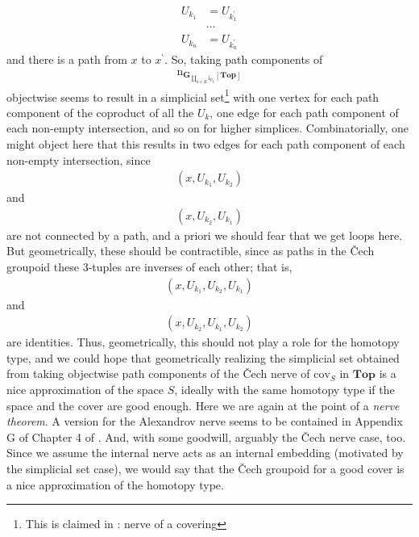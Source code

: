 \begin{align*}
  U_{k_{1}}
  &=
  U_{k_{1}^{\backprime}}
  \\
  &\cdots
  \\
  U_{k_{n}}
  &=
  U_{k_{n}^{\backprime}}
\end{align*}
and there is a path from $x$ to $x^{\backprime}$.
So, taking path components of
\begin{align*}
  \mathrm{n}_{\mathbf{G}_{\coprod_{k \in K}\mathrm{i}_{U_{k}}}[\mathbf{Top}]}
\end{align*}
objectwise seems to result in a simplicial set\footnote{This is claimed in \cite{wiki-pedia0en}: nerve of a covering} with one vertex for each path component of the coproduct of all the $U_{k}$, one edge for each path component of each non-empty intersection, and so on for higher simplices.
Combinatorially, one might object here that this results in two edges for each path component of each non-empty intersection, since
\begin{align*}
  \left(
    x,
    U_{k_{1}},
    U_{k_{2}}
  \right)
\end{align*}
and
\begin{align*}
  \left(
    x,
    U_{k_{2}},
    U_{k_{1}}
  \right)
\end{align*}
are not connected by a path, and a priori we should fear that we get loops here.
But geometrically, these should be contractible, since as paths in the \v{C}ech groupoid these $3$-tuples are inverses of each other; that is,
\begin{align*}
  \left(
    x,
    U_{k_{1}},
    U_{k_{2}},
    U_{k_{1}}
  \right)
\end{align*}
and
\begin{align*}
  \left(
    x,
    U_{k_{2}},
    U_{k_{1}},
    U_{k_{2}}
  \right)
\end{align*}
are identities.
Thus, geometrically, this should not play a role for the homotopy type, and we could hope that geometrically realizing the simplicial set obtained from taking objectwise path components of the \v{C}ech nerve of $\mathrm{cov}_{S}$ in $\mathbf{Top}$ is a nice approximation of the space $S$, ideally with the same homotopy type if the space and the cover are good enough.
Here we are again at the point of a \textit{nerve theorem}.
A version for the Alexandrov nerve seems to be contained in Appendix G of Chapter 4 of \cite{8b5861fc}.
And, with some goodwill, arguably the \v{C}ech nerve case, too.
Since we assume the internal nerve acts as an internal embedding (motivated by the simplicial set case), we would say that the \v{C}ech groupoid for a good cover is a nice approximation of the homotopy type.
